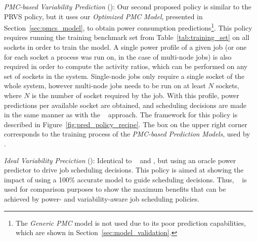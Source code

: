 \par
\textit{PMC-based Variability Prediction} (\PMCVSSched): Our second proposed policy is similar to the PRVS policy, but it uses our \textit{Optimized PMC Model}, presented in Section~\ref{sec:pmcs_model}, to obtain power consumption predictions\footnote{The \textit{Generic PMC} model is not used due to its poor prediction capabilities, which are shown in Section~\ref{sec:model_validation}.}.  
This policy requires running the training benchmark set from Table~\ref{tab:training_set} on all sockets in order to train the model.  
A single power profile of a given job (or one for each socket a process was run on, in the case of multi-node jobs) is also required in order to compute the activity ratios, which can be performed on any set of sockets in the system. Single-node jobs only require a single socket of the whole system, however multi-node jobs needs to be run on at least $N$ sockets, where $N$ is the number of socket required by the job.
 With this profile, power predictions per available socket are obtained, and scheduling decisions are made in the
same manner as with the \PRVSSched~ approach. 
The framework for this policy is described in Figure~\ref{fig:pred_policy_recipe}. 
The box on the upper right corner corresponds to the training process of the \textit{PMC-based Prediction Models}, used by \PMCVSSched.
\par
\textit{Ideal Variability Preciction} (\IVSSched): Identical to \PRVSSched~ and \PMCVSSched, but using an oracle power predictor to drive job scheduling decisions. 
This policy is aimed at showing the impact of using a 100\% accurate model to guide scheduling decisions. Thus, \IVSSched~ is used for comparison purposes to show the maximum benefits that can be achieved by power- and variability-aware job scheduling policies.

